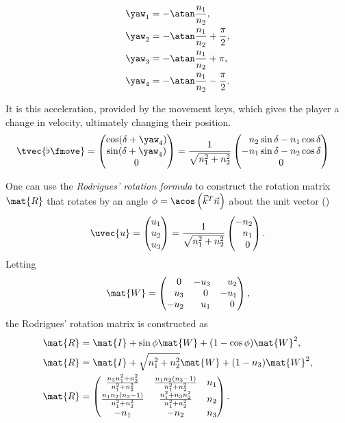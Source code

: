 \begin{align*}
\yaw_1 &= -\atan\frac{n_1}{n_2},\\
\yaw_2 &= -\atan\frac{n_1}{n_2} + \frac{\pi}{2},\\
\yaw_3 &= -\atan\frac{n_1}{n_2} + \pi,\\
\yaw_4 &= -\atan\frac{n_1}{n_2} - \frac{\pi}{2}.
\end{align*}

It is this acceleration, provided by the movement keys, which gives the player a change in velocity, ultimately changing their position.
\begin{align*}
\tvec{\flat{\fmove}} &=
\begin{pmatrix}
\cos(\delta+\yaw_4) \\ \sin(\delta+\yaw_4) \\ 0
\end{pmatrix} = \frac{1}{\sqrt{n_1^2 + n_2^2}}
\begin{pmatrix}
\hphantom{-}n_2\sin\delta - n_1\cos\delta\\
-n_1\sin\delta - n_2\cos\delta\\
0
\end{pmatrix}
\end{align*}

One can use the \emph{Rodrigues' rotation formula} to construct the rotation matrix $\mat{R}$ that rotates by an angle $\phi = \acos\left(\vec{k}^T\vec{n} \right)$ about the unit vector (\purplearrow)
\begin{equation}
\label{eq:u}
\uvec{u} =
\begin{pmatrix}
u_1\\u_2\\u_3
\end{pmatrix} = \frac{1}{\sqrt{n_1^2 + n_2^2}}
\begin{pmatrix}
-n_2\\\hphantom{-}n_1\\\hphantom{-}0
\end{pmatrix}.
\end{equation}
Letting
\[
\mat{W} =
\begin{pmatrix}
\hphantom{-}0 & -u_3 & \hphantom{-}u_2\\
\hphantom{-}u_3 & \hphantom{-}0 & -u_1\\
-u_2 & \hphantom{-}u_1 & \hphantom{-}0
\end{pmatrix},
\]
the Rodrigues' rotation matrix is constructed as
\begin{align*}
\mat{R} &= \mat{I} + \sin \phi \mat{W} + (1 - \cos \phi) \mat{W}^2,\\
\mat{R} &= \mat{I} + \sqrt{n_1^2 + n_2^2}\mat{W} + (1 - n_3)\mat{W}^2,\\
\mat{R} &=
\begin{pmatrix}
\frac{n_3 n_1^2 + n_2^2}{n_1^2 + n_2^2} & \frac{n_1 n_2 (n_3 - 1)}{n_1^2 + n_2^2} & n_1\\
\frac{n_1 n_2 (n_3 - 1)}{n_1^2 + n_2^2} & \frac{n_1^2 + n_3 n_2^2}{n_1^2 + n_2^2} & n_2\\
-n_1 & -n_2 & n_3
\end{pmatrix}.
\end{align*}

